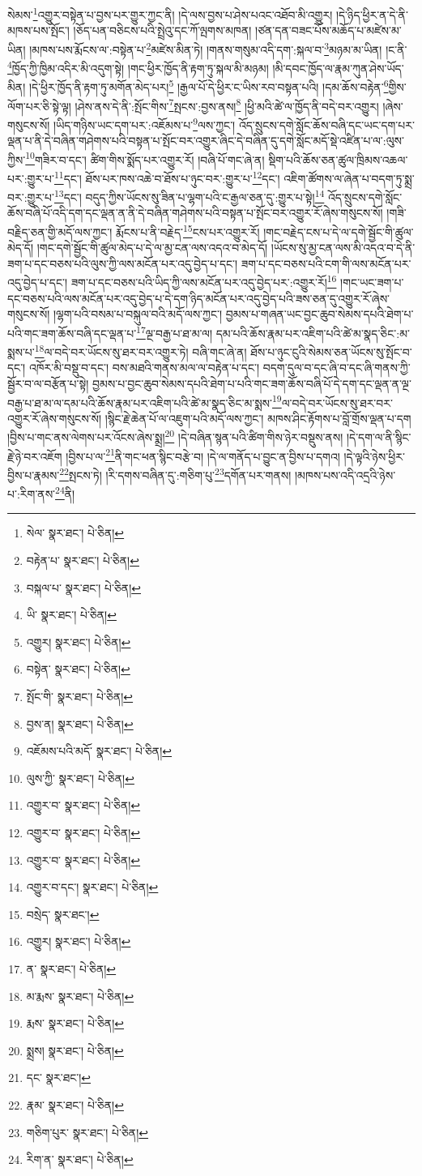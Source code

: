 སེམས་\footnote{སེལ་  སྣར་ཐང་།  པེ་ཅིན། }འགྱུར་བསྟེན་པ་བྱས་པར་གྱུར་ཀྱང་ནི། །དེ་ལས་བྱས་པ་ཤེས་པའང་འཐོབ་མི་འགྱུར། །དེ་ཉིད་ཕྱིར་ན་དེ་ནི་མཁས་པས་སྤོང་། །ཅོད་པན་བཅིངས་པའི་སྤྲེའུ་དང་ཀོ་ལྤགས་མཁན། །ཙན་དན་བཟང་པོས་མཆོད་པ་མཛེས་མ་ཡིན། །མཁས་པས་རྨོངས་ལ་:བསྟེན་པ་\footnote{བརྟེན་པ་  སྣར་ཐང་།  པེ་ཅིན། }མཛེས་མིན་ཏེ། །གནས་གསུམ་འདི་དག་:སྐལ་བ་\footnote{བསྐལ་པ་  སྣར་ཐང་།  པེ་ཅིན། }མཉམ་མ་ཡིན། །ང་ནི་\footnote{ཡི་  སྣར་ཐང་།  པེ་ཅིན། }ཁྱོད་ཀྱི་ཁྱིམ་འདིར་མི་འདུག་སྟེ། །གང་ཕྱིར་ཁྱོད་ནི་རྟག་ཏུ་སྐལ་མི་མཉམ། །མི་དབང་ཁྱོད་ལ་རྣམ་ཀུན་ཤེས་ཡོད་མིན། །དེ་ཕྱིར་ཁྱོད་ནི་རྟག་ཏུ་མགོན་མེད་པར།\footnote{འགྱུར།  སྣར་ཐང་།  པེ་ཅིན། } །རྒྱལ་པོ་དེ་ཕྱིར་ང་ཡིས་རབ་བསྟན་པའི། །དམ་ཆོས་བརྟེན་\footnote{བསྟེན་  སྣར་ཐང་།  པེ་ཅིན། }གྱིས་ལོག་པར་ཅི་སྟེ་ལྟ། །ཤེས་ནས་དེ་ནི་:སྤོང་གིས་\footnote{སྤོང་གི་  སྣར་ཐང་།  པེ་ཅིན། }སྤངས་:བྱས་ནས།\footnote{བྱས་ན།  སྣར་ཐང་།  པེ་ཅིན། } །ཕྱི་མའི་ཚེ་ལ་ཁྱོད་ནི་བདེ་བར་འགྱུར། །ཞེས་གསུངས་སོ། །ཡིད་གཉིས་ཡང་དག་པར་:འཇོམས་པ་\footnote{འཇོམས་པའི་མདོ་  སྣར་ཐང་།  པེ་ཅིན། }ལས་ཀྱང་། འོད་སྲུངས་དགེ་སློང་ཆོས་བཞི་དང་ཡང་དག་པར་ལྡན་པ་ནི་དེ་བཞིན་གཤེགས་པའི་བསྟན་པ་སྤོང་བར་འགྱུར་ཞིང་དེ་བཞིན་དུ་དགེ་སློང་མདོ་སྡེ་འཛིན་པ་ལ་:ལུས་ཀྱིས་\footnote{ལུས་ཀྱི་  སྣར་ཐང་།  པེ་ཅིན། }གཟིར་བ་དང་། ཚིག་གིས་སྨོད་པར་འགྱུར་རོ། །བཞི་པོ་གང་ཞེ་ན། སྡིག་པའི་ཆོས་ཅན་ཚུལ་ཁྲིམས་འཆལ་པར་:གྱུར་པ་\footnote{འགྱུར་བ་  སྣར་ཐང་།  པེ་ཅིན། }དང་། ཐོས་པར་ཁས་འཆེ་བ་ཐོས་པ་ཉུང་བར་:གྱུར་པ་\footnote{འགྱུར་བ་  སྣར་ཐང་།  པེ་ཅིན། }དང་། འཇིག་ཚོགས་ལ་ཞེན་པ་བདག་ཏུ་སྨྲ་བར་:གྱུར་པ་\footnote{འགྱུར་བ་  སྣར་ཐང་།  པེ་ཅིན། }དང་། བདུད་ཀྱིས་ཡོངས་སུ་ཟིན་པ་ལྷག་པའི་ང་རྒྱལ་ཅན་དུ་:གྱུར་པ་སྟེ།\footnote{འགྱུར་བ་དང་།  སྣར་ཐང་།  པེ་ཅིན། } འོད་སྲུངས་དགེ་སློང་ཆོས་བཞི་པོ་འདི་དག་དང་ལྡན་ན་ནི་དེ་བཞིན་གཤེགས་པའི་བསྟན་པ་སྤོང་བར་འགྱུར་རོ་ཞེས་གསུངས་སོ། །གཟི་བརྗིད་ཅན་གྱི་མདོ་ལས་ཀྱང་། རྨོངས་པ་ནི་བརྗེད་\footnote{བསྲེད་  སྣར་ཐང་། }ངས་པར་འགྱུར་རོ། །གང་བརྗེད་ངས་པ་དེ་ལ་དགེ་སྦྱོང་གི་ཚུལ་མེད་དོ། །གང་དགེ་སྦྱོང་གི་ཚུལ་མེད་པ་དེ་ལ་མྱ་ངན་ལས་འདའ་བ་མེད་དོ། །ཡོངས་སུ་མྱ་ངན་ལས་མི་འདའ་བ་དེ་ནི་ཟག་པ་དང་བཅས་པའི་ལུས་ཀྱི་ལས་མངོན་པར་འདུ་བྱེད་པ་དང་། ཟག་པ་དང་བཅས་པའི་ངག་གི་ལས་མངོན་པར་འདུ་བྱེད་པ་དང་། ཟག་པ་དང་བཅས་པའི་ཡིད་ཀྱི་ལས་མངོན་པར་འདུ་བྱེད་པར་:འགྱུར་རོ།\footnote{འགྱུར།  སྣར་ཐང་།  པེ་ཅིན། } །གང་ཡང་ཟག་པ་དང་བཅས་པའི་ལས་མངོན་པར་འདུ་བྱེད་པ་དེ་དག་ཉིད་མངོན་པར་འདུ་བྱེད་པའི་ཟས་ཅན་དུ་འགྱུར་རོ་ཞེས་གསུངས་སོ། །ལྷག་པའི་བསམ་པ་བསྐུལ་བའི་མདོ་ལས་ཀྱང་། བྱམས་པ་གཞན་ཡང་བྱང་ཆུབ་སེམས་དཔའི་ཐེག་པ་པའི་གང་ཟག་ཆོས་བཞི་དང་ལྡན་པ་\footnote{ན་  སྣར་ཐང་།  པེ་ཅིན། }ལྔ་བརྒྱ་པ་ཐ་མ་ལ། དམ་པའི་ཆོས་རྣམ་པར་འཇིག་པའི་ཚེ་མ་སྣད་ཅིང་:མ་སྨས་པ་\footnote{མ་རྨས་  སྣར་ཐང་།  པེ་ཅིན། }ལ་བདེ་བར་ཡོངས་སུ་ཐར་བར་འགྱུར་ཏེ། བཞི་གང་ཞེ་ན། ཐོས་པ་ཉུང་ངུའི་སེམས་ཅན་ཡོངས་སུ་སྤོང་བ་དང་། འཁོར་མི་བསྡུ་བ་དང་། བས་མཐའི་གནས་མལ་ལ་བརྟེན་པ་དང་། བདག་དུལ་བ་དང་ཞི་བ་དང་ཞི་གནས་ཀྱི་སྦྱོར་བ་ལ་བརྩོན་པ་སྟེ། བྱམས་པ་བྱང་ཆུབ་སེམས་དཔའི་ཐེག་པ་པའི་གང་ཟག་ཆོས་བཞི་པོ་དེ་དག་དང་ལྡན་ན་ལྔ་བརྒྱ་པ་ཐ་མ་ལ་དམ་པའི་ཆོས་རྣམ་པར་འཇིག་པའི་ཚེ་མ་སྣད་ཅིང་མ་སྨས་\footnote{རྨས་  སྣར་ཐང་།  པེ་ཅིན། }ལ་བདེ་བར་ཡོངས་སུ་ཐར་བར་འགྱུར་རོ་ཞེས་གསུངས་སོ། །སྙིང་རྗེ་ཆེན་པོ་ལ་འཇུག་པའི་མདོ་ལས་ཀྱང་། མཁས་ཤིང་རྟོགས་པ་བློ་གྲོས་ལྡན་པ་དག །བྱིས་པ་གང་ནས་ལེགས་པར་འོངས་ཞེས་སྨྲ།\footnote{སྨྲས།  སྣར་ཐང་།  པེ་ཅིན། } །དེ་བཞིན་སྙན་པའི་ཚིག་གིས་ཉེར་བསྡུས་ནས། །དེ་དག་ལ་ནི་སྙིང་རྗེ་ཉེ་བར་འཇོག །བྱིས་པ་ལ་\footnote{དང་  སྣར་ཐང་། }ནི་གང་ཕན་སྙིང་བརྩེ་བ། །དེ་ལ་གནོད་པ་བྱུང་ན་བྱིས་པ་དགའ། །དེ་ལྟའི་ཉེས་ཕྱིར་བྱིས་པ་རྣམས་\footnote{རྣམ་  སྣར་ཐང་།  པེ་ཅིན། }སྤངས་ཏེ། །རི་དགས་བཞིན་དུ་:གཅིག་པུ་\footnote{གཅིག་པུར་  སྣར་ཐང་།  པེ་ཅིན། }དགོན་པར་གནས། །མཁས་པས་འདི་འདྲའི་ཉེས་པ་:རིག་ནས་\footnote{རིག་ན་  སྣར་ཐང་།  པེ་ཅིན། }ནི། 